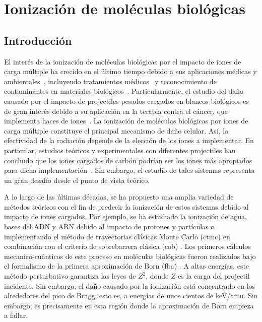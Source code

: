 \chapter{Ionización de moléculas biológicas}

\section{Introducción}

El interés de la ionización de moléculas biológicas por el impacto de 
iones de carga múltiple ha crecido en el último tiempo debido a sus 
aplicaciones médicas y ambientales~\cite{Liamsuwan:13}, incluyendo 
tratamientos médicos~\cite{Mohamad:17,Baskar:12,Denifl:11,Solov:09} y 
reconocimiento de contaminantes en materiales biológicos~\cite{Gafur:18,
FerrazDias:13}. Particularmente, el estudio del daño causado por el 
impacto de projectiles pesados cargados en blancos biológicos es de gran
interés debido a su aplicación en la terapia contra el cáncer, que 
implementa haces de iones~\cite{Baskar:12}. La ionización de moléculas 
biológicas por iones de carga múltiple constituye el principal mecanismo 
de daño celular. Así, la efectividad de la radiación depende de la 
elección de los iones a implementar. En particular, estudios teóricos y 
experimentales con diferentes projectiles han concluido que los iones 
cargados de carbón podrían ser los iones más apropiados para dicha 
implementación~\cite{Mohamad:17}. Sin embargo, el estudio de tales 
sistemas representa un gran desafío desde el punto de vista teórico. 

A lo largo de las últimas décadas, se ha propuesto una amplia variedad de 
métodos teóricos con el fin de predecir la ionización de estos sistemas 
debido al impacto de iones cargados. Por ejemplo, se ha estudiado la 
ionización de agua, bases del ADN y ARN debido al impacto de protones y 
partículas $\alpha$ implementando el método de trayectorias clásicas 
Monte Carlo (\acs{ctmc}) en combinación con el criterio de sobrebarrera 
clásica (\acs{cob}) \cite{Abbas:08,Lekadir:09}. Los primeros cálculos 
mecanico-cuánticos de este proceso en moléculas biológicas fueron 
realizados bajo el formalismo de la primera aproximación de Born 
(\acs{fba}) \cite{DalCappello:08,Champion:10}. A altas energías, este 
método perturbativo garantiza las leyes de $Z^2$, donde $Z$ es la carga 
del projectil incidente. Sin embargo, el daño causado por la ionización 
está concentrado en los alrededores del pico de Bragg, esto es, a 
energías de unos cientos de keV/amu. Sin embargo, es precisamente en esta 
región donde la aproximación de Born empieza a fallar. 

